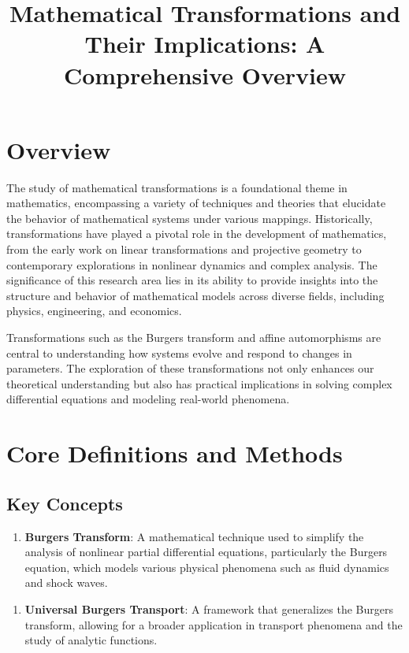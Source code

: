 \documentclass[11pt,a4paper]{article}
\title{Mathematical Transformations and Their Implications: A Comprehensive Overview}
\date{}
\begin{document}
\maketitle

\section{Overview}

The study of mathematical transformations is a foundational theme in mathematics, encompassing a variety of techniques and theories that elucidate the behavior of mathematical systems under various mappings. Historically, transformations have played a pivotal role in the development of mathematics, from the early work on linear transformations and projective geometry to contemporary explorations in nonlinear dynamics and complex analysis. The significance of this research area lies in its ability to provide insights into the structure and behavior of mathematical models across diverse fields, including physics, engineering, and economics.

Transformations such as the Burgers transform and affine automorphisms are central to understanding how systems evolve and respond to changes in parameters. The exploration of these transformations not only enhances our theoretical understanding but also has practical implications in solving complex differential equations and modeling real-world phenomena.

\section{Core Definitions and Methods}

\subsection{Key Concepts}

\begin{enumerate}
\item \textbf{Burgers Transform}: A mathematical technique used to simplify the analysis of nonlinear partial differential equations, particularly the Burgers equation, which models various physical phenomena such as fluid dynamics and shock waves.
\end{enumerate}

\begin{enumerate}
\item \textbf{Universal Burgers Transport}: A framework that generalizes the Burgers transform, allowing for a broader application in transport phenomena and the study of analytic functions.
\end{enumerate}
\end{document}
